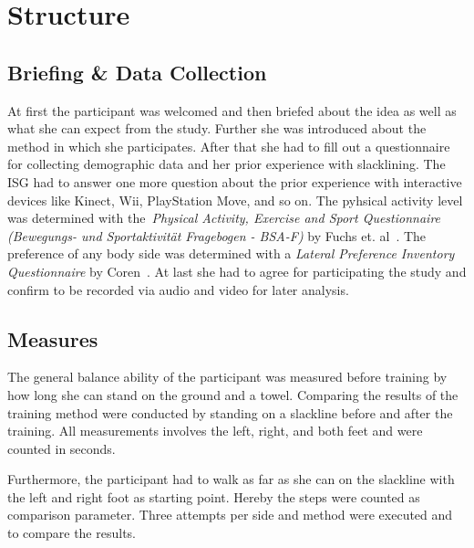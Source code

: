 \section{Structure}

\subsection{Briefing \& Data Collection}
At first the participant was welcomed and then briefed about the idea as well as what she can expect from the study. Further she was introduced about the method in which she participates. 
After that she had to fill out a questionnaire for collecting demographic data and her prior experience with slacklining. The ISG had to answer one more question about the prior experience with interactive devices like Kinect, Wii, PlayStation Move, and so on.
The pyhsical activity level was determined with the~\textit{Physical Activity, Exercise and Sport Questionnaire (Bewegungs- und Sportaktivität Fragebogen - BSA-F)} by Fuchs et. al~\cite{Fuchs2015-bsa}. The preference of any body side was determined with a \textit{Lateral Preference Inventory Questionnaire} by Coren~\cite{Coren1993-lp}. At last she had to agree for participating the study and confirm to be recorded via audio and video for later analysis.

\subsection{}

\subsection{Measures}
The general balance ability of the participant was measured before training by how long she can stand on the ground and a towel. Comparing the results of the training method were conducted by standing on a slackline before and after the training. All measurements involves the left, right, and both feet and were counted in seconds. 

Furthermore, the participant had to walk as far as she can on the slackline with the left and right foot as starting point. Hereby the steps were counted as comparison parameter. Three attempts per side and method were executed and  to compare the results.


